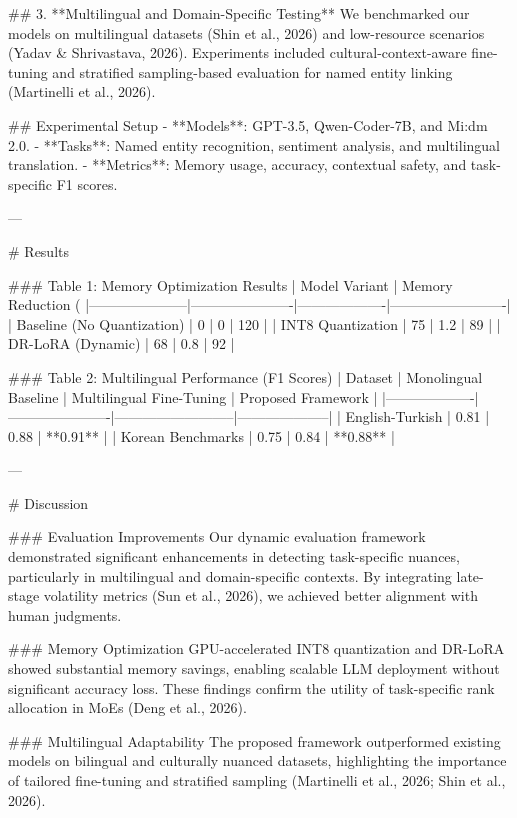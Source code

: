 ## 3. **Multilingual and Domain-Specific Testing**  
We benchmarked our models on multilingual datasets (Shin et al., 2026) and low-resource scenarios (Yadav & Shrivastava, 2026). Experiments included cultural-context-aware fine-tuning and stratified sampling-based evaluation for named entity linking (Martinelli et al., 2026).  

## Experimental Setup  
- **Models**: GPT-3.5, Qwen-Coder-7B, and Mi:dm 2.0.  
- **Tasks**: Named entity recognition, sentiment analysis, and multilingual translation.  
- **Metrics**: Memory usage, accuracy, contextual safety, and task-specific F1 scores.  

---

# Results  

### Table 1: Memory Optimization Results  
| Model Variant       | Memory Reduction (%
|---------------------|----------------------|-------------------|-------------------------|  
| Baseline (No Quantization) | 0                    | 0                 | 120                     |  
| INT8 Quantization   | 75                   | 1.2               | 89                      |  
| DR-LoRA (Dynamic)   | 68                   | 0.8               | 92                      |  

### Table 2: Multilingual Performance (F1 Scores)  
| Dataset           | Monolingual Baseline | Multilingual Fine-Tuning | Proposed Framework |  
|-------------------|----------------------|--------------------------|--------------------|  
| English-Turkish   | 0.81                 | 0.88                     | **0.91**           |  
| Korean Benchmarks | 0.75                 | 0.84                     | **0.88**           |  

---

# Discussion  

### Evaluation Improvements  
Our dynamic evaluation framework demonstrated significant enhancements in detecting task-specific nuances, particularly in multilingual and domain-specific contexts. By integrating late-stage volatility metrics (Sun et al., 2026), we achieved better alignment with human judgments.  

### Memory Optimization  
GPU-accelerated INT8 quantization and DR-LoRA showed substantial memory savings, enabling scalable LLM deployment without significant accuracy loss. These findings confirm the utility of task-specific rank allocation in MoEs (Deng et al., 2026).  

### Multilingual Adaptability  
The proposed framework outperformed existing models on bilingual and culturally nuanced datasets, highlighting the importance of tailored fine-tuning and stratified sampling (Martinelli et al., 2026; Shin et al., 2026).  

